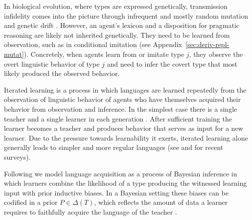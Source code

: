 \documentclass[a4paper, 11pt]{article}
\theoremstyle{Satz}
\begin{document}
In biological evolution, where types are expressed genetically, transmission infidelity comes
into the picture through infrequent and mostly random mutation and genetic drift
\citep{kimura:1983}. However, an agent's lexicon and a disposition for pragmatic reasoning are
likely not inherited genetically. They need to be learned from observation, such as in
conditional imitation (see Appendix~\ref{sec:deriv-repl-mutat}).  Concretely, when agents learn
from or imitate type $j$, they observe the overt linguistic behavior of type $j$ and need to
infer the covert type that most likely produced the observed behavior.

Iterated learning is a process in which languages are learned repeatedly from the observation
of linguistic behavior of agents who have themselves acquired their behavior from observation
and inference. In the simplest case there is a single teacher and a single learner in each
generation \citep[e.g.,][]{kirby:2001,brighton:2002}. After sufficient training the learner
becomes a teacher and produces behavior that serves as input for a new learner. Due to the
pressure towards learnability it exerts, iterated learning alone generally leads to simpler and
more regular languages (see \citealt{kirby+etal:2014} and \citealt{tamariz+kirby:2016} for
recent surveys).

Following \citet{griffiths+kalish:2005,griffiths+kalish:2007} we model language acquisition as
a process of Bayesian inference in which learners combine the likelihood of a type producing
the witnessed learning input with prior inductive biases. In a Bayesian setting these biases
can be codified in a prior $P \in \Delta(T)$, which reflects the amount of data a learner
requires to faithfully acquire the language of the teacher
\citep[cf.][450]{griffiths+kalish:2007}.
\end{document}
